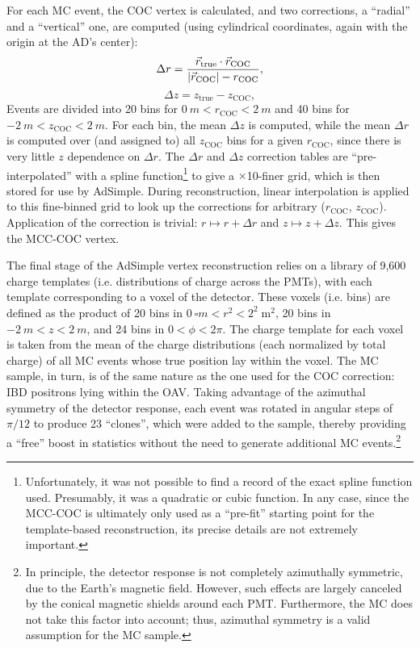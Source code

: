 \documentclass[../thesis.tex]{subfiles}
\begin{document}
For each MC event, the COC vertex is calculated, and two corrections, a ``radial'' and a ``vertical'' one, are computed (using cylindrical coordinates, again with the origin at the AD's center):
\begin{equation}
  \Delta r = \frac{\vec{r}_{\mathrm{true}} \cdot \vec{r}_{\mathrm{COC}}}{\lvert \vec{r}_{\mathrm{COC}}\rvert - r_{\mathrm{COC}}},
\end{equation}
\begin{equation}
  \Delta z = z_{\mathrm{true}} - z_{\mathrm{COC}},
\end{equation}
Events are divided into 20 bins for $\SI{0}{m} < r_{\mathrm{COC}} < \SI{2}{m}$ and 40 bins for $\SI{-2}{m} < z_{\mathrm{COC}} < \SI{2}{m}$. For each bin, the mean $\Delta z$ is computed, while the mean $\Delta r$ is computed over (and assigned to) all $z{_\mathrm{COC}}$ bins for a given $r_{\mathrm{COC}}$, since there is very little $z$ dependence on $\Delta r$. The $\Delta r$ and $\Delta z$ correction tables are ``pre-interpolated'' with a spline function\footnote{Unfortunately, it was not possible to find a record of the exact spline function used. Presumably, it was a quadratic or cubic function. In any case, since the MCC-COC is ultimately only used as a ``pre-fit'' starting point for the template-based reconstruction, its precise details are not extremely important.} to give a $\times$10-finer grid, which is then stored for use by AdSimple. During reconstruction, linear interpolation is applied to this fine-binned grid to look up the corrections for arbitrary ($r_{\mathrm{COC}}$, $z_{\mathrm{COC}}$). Application of the correction is trivial: $r \mapsto r + \Delta r$ and $z \mapsto z + \Delta z$. This gives the MCC-COC vertex.

The final stage of the AdSimple vertex reconstruction relies on a library of 9,600 charge templates (i.e. distributions of charge across the PMTs), with each template corresponding to a voxel of the detector. These voxels (i.e. bins) are defined as the product of 20 bins in $\SI{0}{\square m} < r^2 < 2^2\;\mathrm{m}^2$, 20 bins in $\SI{-2}{m} < z < \SI{2}{m}$, and 24 bins in $0 < \phi < 2\pi$. The charge template for each voxel is taken from the mean of the charge distributions (each normalized by total charge) of all MC events whose true position lay within the voxel. The MC sample, in turn, is of the same nature as the one used for the COC correction: IBD positrons lying within the OAV. Taking advantage of the azimuthal symmetry of the detector response, each event was rotated in angular steps of $\pi/12$ to produce 23 ``clones'', which were added to the sample, thereby providing a ``free'' boost in statistics without the need to generate additional MC events.\footnote{In principle, the detector response is not completely azimuthally symmetric, due to the Earth's magnetic field. However, such effects are largely canceled by the conical magnetic shields around each PMT. Furthermore, the MC does not take this factor into account; thus, azimuthal symmetry is a valid assumption for the MC sample.}
\end{document}
